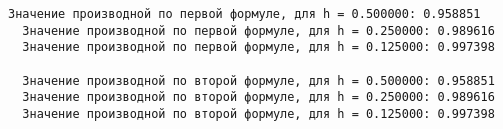\begin{lstlisting}[backgroundcolor=\color{cyan}]
  Значение производной по первой формуле, для h = 0.500000: 0.958851
  Значение производной по первой формуле, для h = 0.250000: 0.989616
  Значение производной по первой формуле, для h = 0.125000: 0.997398

  Значение производной по второй формуле, для h = 0.500000: 0.958851
  Значение производной по второй формуле, для h = 0.250000: 0.989616
  Значение производной по второй формуле, для h = 0.125000: 0.997398
\end{lstlisting}
